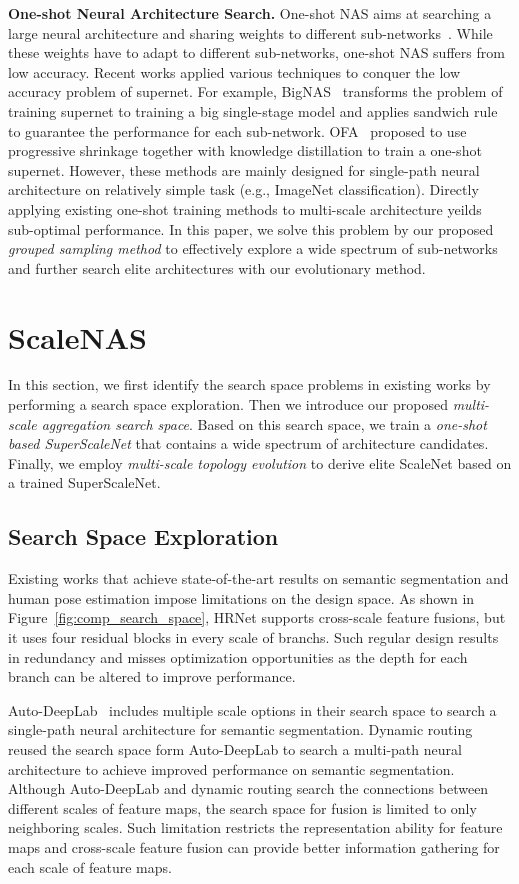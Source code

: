 \documentclass[final]{cvpr}
\newcommand{\workname}{ScaleNAS\xspace}
\newcommand{\netname}{ScaleNet\xspace}
\newcommand{\supernet}{SuperScaleNet\xspace}
\begin{document}
\noindent\textbf{One-shot Neural Architecture Search.}
One-shot NAS aims at searching a large neural architecture and sharing weights to different sub-networks~\cite{pham2018efficient, bender2018understanding, liu2018darts, cai2018proxylessnas, guo2020single}. While these weights have to adapt to different sub-networks, one-shot NAS suffers from low accuracy. Recent works applied various techniques to conquer the low accuracy problem of supernet. For example, BigNAS~\cite{yu2020bignas} transforms the problem of training supernet to training a big single-stage model and applies sandwich rule to guarantee the performance for each sub-network. OFA~\cite{cai2020once} proposed to use progressive shrinkage together with knowledge distillation to train a one-shot supernet. However, these methods are mainly designed for single-path neural architecture on relatively simple task (e.g., ImageNet classification). 
Directly applying existing one-shot training methods to multi-scale architecture yeilds sub-optimal performance.
In this paper, we solve this problem by our proposed \textit{grouped sampling method} to effectively explore a wide spectrum of sub-networks and further search elite architectures with our evolutionary method. \section{\workname}
In this section, we first identify the search space problems in existing works by performing a search space exploration.
Then we introduce our proposed \textit{multi-scale aggregation search space}. Based on this search space, we train a \textit{one-shot based \supernet} that contains a wide spectrum of architecture candidates. Finally, we employ \textit{multi-scale topology evolution} to derive elite \netname based on a trained \supernet. 

\subsection{Search Space Exploration}
Existing works that achieve state-of-the-art results on semantic segmentation and human pose estimation impose limitations on the design space.
As shown in Figure~\ref{fig:comp_search_space},
HRNet supports cross-scale feature fusions, but it uses four residual blocks in every scale of branchs. Such regular design results in redundancy and misses optimization opportunities as the depth for each branch can be altered to improve performance. 

Auto-DeepLab~\cite{liu2019auto} includes multiple scale options in their search space to search a single-path neural architecture for semantic segmentation. 
Dynamic routing~\cite{li2020learning} reused the search space form Auto-DeepLab to search a multi-path neural architecture to achieve improved performance on semantic segmentation. 
Although Auto-DeepLab and dynamic routing search the connections between different scales of feature maps, the search space for fusion is limited to only neighboring scales.
Such limitation restricts the representation ability for feature maps and cross-scale feature fusion can provide better information gathering for each scale of feature maps. 
\end{document}
